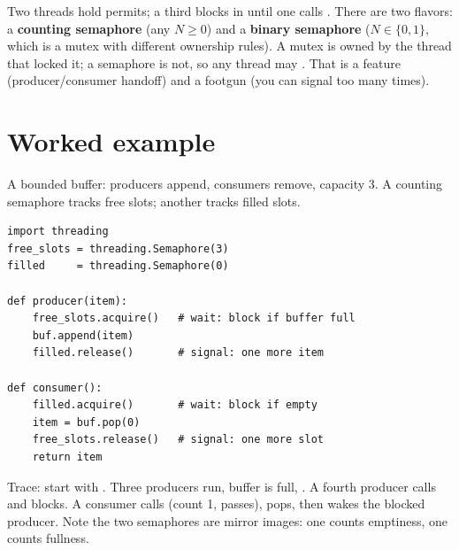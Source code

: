 \documentclass[11pt]{article}
\begin{document}
\begin{center}
\end{center}

Two threads hold permits; a third blocks in  until one calls . There are two flavors: a \textbf{counting semaphore} (any $N \ge 0$) and a \textbf{binary semaphore} ($N \in \{0,1\}$, which is a mutex with different ownership rules). A mutex is owned by the thread that locked it; a semaphore is not, so any thread may . That is a feature (producer/consumer handoff) and a footgun (you can signal too many times).

\section{Worked example}
A bounded buffer: producers append, consumers remove, capacity 3. A counting semaphore tracks free slots; another tracks filled slots.

\begin{lstlisting}[style=py]
import threading
free_slots = threading.Semaphore(3)
filled     = threading.Semaphore(0)

def producer(item):
    free_slots.acquire()   # wait: block if buffer full
    buf.append(item)
    filled.release()       # signal: one more item

def consumer():
    filled.acquire()       # wait: block if empty
    item = buf.pop(0)
    free_slots.release()   # signal: one more slot
    return item
\end{lstlisting}

Trace: start with . Three producers run, buffer is full, . A fourth producer calls  and blocks. A consumer calls  (count 1, passes), pops, then  wakes the blocked producer. Note the two semaphores are mirror images: one counts emptiness, one counts fullness.
\end{document}
